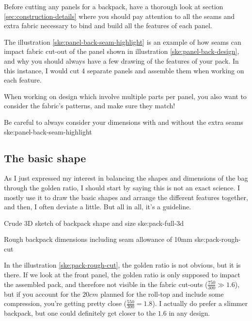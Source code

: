 Before cutting any panels for a backpack, have a thorough look at section \ref{sec:construction-details} where you should pay attention to all the seams and extra fabric necessary to bind and build all the features of each panel.

The illustration \ref{ske:panel-back-seam-highlight} is an example of how seams can impact fabric cut-out of the panel shown in illustration \ref{ske:panel-back-design}, and why you should always have a few drawing of the features of your pack. In this instance, I would cut 4 separate panels and assemble them when working on each feature.

\begin{note}
  When working on design which involve multiple parts per panel, you also want to consider the fabric's patterns, and make sure they match!
\end{note}

{Be careful to always consider your dimensions with and without the extra seams}
{ske:panel-back-seam-highlight}

\subsection{The basic shape}

As I just expressed my interest in balancing the shapes and dimensions of the bag through the golden ratio, I should start by saying this is not an exact science. I mostly use it to draw the basic shapes and arrange the different features together, and then, I often deviate a little. But all in all, it's a guideline.

{Crude 3D sketch of backpack shape and size}
{ske:pack-full-3d}

{Rough backpack dimensions including seam allowance of 10mm}
{ske:pack-rough-cut}

In the illustration \ref{ske:pack-rough-cut}, the golden ratio is not obvious, but it is there. If we look at the front panel, the golden ratio is only supposed to impact the assembled pack, and therefore not visible in the fabric cut-outs ($\frac{750}{300} \gg 1.6$), but if you account for the $20cm$ planned for the roll-top and include some compression, you're getting pretty close ($\frac{550}{300} = 1.8$). I actually do prefer a slimmer backpack, but one could definitely get closer to the $1.6$ in any design.

